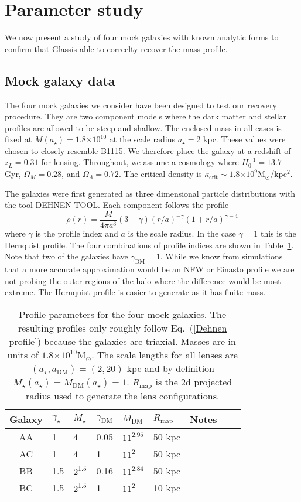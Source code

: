 \documentclass[onecolumn,galley]{mn2e}
\newcommand{\Glass}{{\sc Glass}}
\newcommand{\Rmap}{\ensuremath{R_\mathrm{map}}}
\newcommand{\Msun}{\ensuremath{\mathrm{M}_\odot}}
\newcommand{\tabref}[1] {Table~\ref{#1}}
\newcommand{\eqnref}[1] {Eq.~(\ref{#1})}
\newcommand{\e}[1]{\ensuremath{\times 10^{#1}}}
\begin{document}
\section{Parameter study}

We now present a study of four mock galaxies with known analytic forms to
confirm that \Glass is able to correclty recover the mass profile.

\subsection{Mock galaxy data}

The four mock galaxies we consider have been designed to test our recovery
procedure. They are two component models where the dark matter and stellar
profiles are allowed to be steep and shallow.  The enclosed mass in all cases
is fixed at $M(a_\star)= 1.8\e{10}$ at the scale radius $a_\star=2$ kpc. These
values were chosen to closely resemble B1115. We therefore place the galaxy at
a redshift of $z_L = 0.31$ for lensing.  Throughout, we assume a cosmology
where $H_0^{-1}=13.7$ Gyr, $\Omega_M=0.28$, and $\Omega_\Lambda=0.72$. The
critical density is $\kappa_\mathrm{crit}\sim 1.8\e{9}$\Msun/kpc$^2$.

The galaxies were
first generated as three dimensional particle distributions with the
tool DEHNEN-TOOL. Each component follows the profile
\begin{equation}
\rho(r) = \frac{M}{4\pi a^3}(3-\gamma){(r/a)^{-\gamma}(1 + r/a)^{\gamma-4}}
\label{Dehnen profile}
\end{equation}
where $\gamma$ is the profile index and $a$ is the scale radius.  In the
case $\gamma=1$ this is the Hernquist profile.  The four combinations of
profile indices are shown in \tabref{mock galaxy params}.  Note that two of
the galaxies have $\gamma_\mathrm{DM}=1$. While we know from simulations that a
more accurate approximation would be an NFW or Einasto profile we are not
probing the outer regions of the halo where the difference would be most
extreme.  The Hernquist profile is easier to generate as it has finite mass.

\begin{table}
\begin{tabular}{cllllllll}
Galaxy & $\gamma_\star$ & $M_\star$ & $\gamma_\mathrm{DM}$ & $M_\mathrm{DM}$ & $\Rmap$ & Notes\\
\hline
AA & 1 & 4 & 0.05 & $11^{2.95}$ & 50 kpc & \\
AC & 1 & 4 & 1 & $11^2$ & 50 kpc & \\
BB & 1.5 & $2^{1.5}$ & 0.16 & $11^{2.84}$ & 50 kpc & \\
BC & 1.5 & $2^{1.5}$ & 1 & $11^2$ & 10 kpc & 
\end{tabular}
\caption{Profile parameters for the four mock galaxies. The resulting profiles only roughly follow
\eqnref{Dehnen profile} because the galaxies are triaxial. Masses are in units of $1.8\e{10}\Msun$. The scale lengths for
all lenses are $(a_\star,a_\mathrm{DM})=(2,20)$ kpc and by definition
$M_\star(a_\star) = M_\mathrm{DM}(a_\star) = 1$. $\Rmap$ is the 2d projected radius used to generate the lens configurations.}
\label{mock galaxy params}
\end{table}
\end{document}
